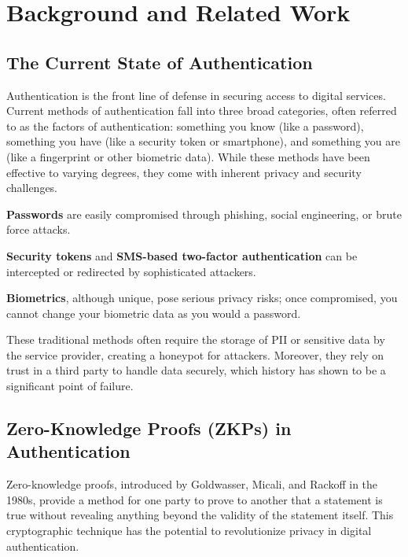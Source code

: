 \section{Background and Related Work}
\label{sec:relwork}

\subsection{The Current State of Authentication}
\label{subsec:auth}

Authentication is the front line of defense in securing access to digital services. Current methods of authentication fall into three broad categories, often referred to as the factors of authentication: something you know (like a password), something you have (like a security token or smartphone), and something you are (like a fingerprint or other biometric data). While these methods have been effective to varying degrees, they come with inherent privacy and security challenges.

\begin{newitemize}
    \item \textbf{Passwords} are easily compromised through phishing, social engineering, or brute force attacks.
    \item \textbf{Security tokens} and \textbf{SMS-based two-factor authentication} can be intercepted or redirected by sophisticated attackers.
    \item \textbf{Biometrics}, although unique, pose serious privacy risks; once compromised, you cannot change your biometric data as you would a password.
\end{newitemize}

These traditional methods often require the storage of PII or sensitive data by the service provider, creating a honeypot for attackers. Moreover, they rely on trust in a third party to handle data securely, which history has shown to be a significant point of failure.

\subsection{Zero-Knowledge Proofs (ZKPs) in Authentication}
\label{subsec:zkp}

Zero-knowledge proofs, introduced by Goldwasser, Micali, and Rackoff in the 1980s, provide a method for one party to prove to another that a statement is true without revealing anything beyond the validity of the statement itself. This cryptographic technique has the potential to revolutionize privacy in digital authentication.

